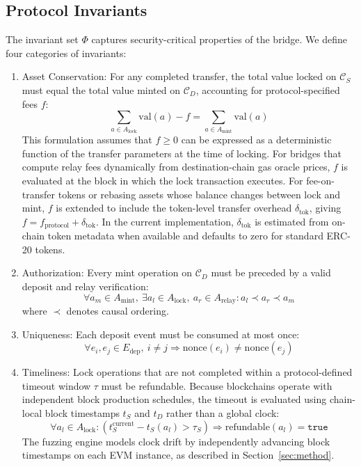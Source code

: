 \documentclass[journal]{IEEEtran}
\begin{document}
\subsection{Protocol Invariants}

The invariant set $\Phi$ captures security-critical properties of the bridge. We define four categories of invariants:

\begin{enumerate}
    \item Asset Conservation: For any completed transfer, the total value locked on $\mathcal{C}_S$ must equal the total value minted on $\mathcal{C}_D$, accounting for protocol-specified fees $f$:
    \begin{equation}
        \sum_{a \in A_{\text{lock}}} \text{val}(a) - f = \sum_{a \in A_{\text{mint}}} \text{val}(a)
    \end{equation}
    This formulation assumes that $f \geq 0$ can be expressed as a deterministic function of the transfer parameters at the time of locking. For bridges that compute relay fees dynamically from destination-chain gas oracle prices, $f$ is evaluated at the block in which the lock transaction executes. For fee-on-transfer tokens or rebasing assets whose balance changes between lock and mint, $f$ is extended to include the token-level transfer overhead $\delta_{\text{tok}}$, giving $f = f_{\text{protocol}} + \delta_{\text{tok}}$. In the current implementation, $\delta_{\text{tok}}$ is estimated from on-chain token metadata when available and defaults to zero for standard ERC-20 tokens.
    \item Authorization: Every mint operation on $\mathcal{C}_D$ must be preceded by a valid deposit and relay verification:
    \begin{equation}
        \forall a_m \in A_{\text{mint}},\ \exists a_l \in A_{\text{lock}},\ a_r \in A_{\text{relay}}: a_l \prec a_r \prec a_m
    \end{equation}
    where $\prec$ denotes causal ordering.
    \item Uniqueness: Each deposit event must be consumed at most once:
    \begin{equation}
        \forall e_i, e_j \in E_{\text{dep}},\ i \neq j \Rightarrow \text{nonce}(e_i) \neq \text{nonce}(e_j)
    \end{equation}
    \item Timeliness: Lock operations that are not completed within a protocol-defined timeout window $\tau$ must be refundable. Because blockchains operate with independent block production schedules, the timeout is evaluated using chain-local block timestamps $t_S$ and $t_D$ rather than a global clock:
    \begin{equation}
        \forall a_l \in A_{\text{lock}}: (t_S^{\text{current}} - t_S(a_l) > \tau_S) \Rightarrow \text{refundable}(a_l) = \texttt{true}
    \end{equation}
    The fuzzing engine models clock drift by independently advancing block timestamps on each EVM instance, as described in Section~\ref{sec:method}.
\end{enumerate}
\end{document}
